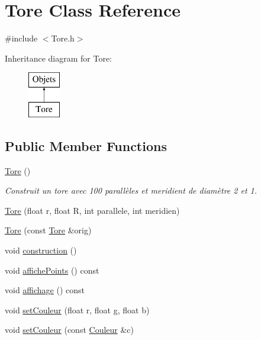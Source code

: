 \hypertarget{classTore}{\section{Tore Class Reference}
\label{classTore}
}


{\ttfamily \#include $<$Tore.\-h$>$}

Inheritance diagram for Tore\-:\begin{figure}[H]
\begin{center}
\leavevmode
\includegraphics[height=2.000000cm]{classTore}
\end{center}
\end{figure}
\subsection*{Public Member Functions}
\begin{DoxyCompactItemize}
\item 
\hyperlink{classTore_a9462794ae1f45462fc36494948b91e30}{Tore} ()
\begin{DoxyCompactList}\small\item\em Construit un tore avec 100 parallèles et meridient de diamètre 2 et 1. \end{DoxyCompactList}\item 
\hyperlink{classTore_a3f8424c442e311c57da21d9736b36603}{Tore} (float r, float R, int parallele, int meridien)
\item 
\hyperlink{classTore_ad9bb3f3d16fd81888cc343261f89263a}{Tore} (const \hyperlink{classTore}{Tore} \&orig)
\item 
void \hyperlink{classTore_acfda6ef660e1a3f3f8c9e78cdb63a629}{construction} ()
\item 
void \hyperlink{classTore_a9f03eb71804801cd86ba7aefa3a16399}{affiche\-Points} () const 
\item 
void \hyperlink{classTore_a4b082286667409f8dfa9a936d2e6c37b}{affichage} () const 
\item 
void \hyperlink{classTore_a0b432929588d434992e84b8b25fd73eb}{set\-Couleur} (float r, float g, float b)
\item 
void \hyperlink{classTore_af296d4d63dba7cea14e93522e6eb39af}{set\-Couleur} (const \hyperlink{classCouleur}{Couleur} \&c)
\end{DoxyCompactItemize}

